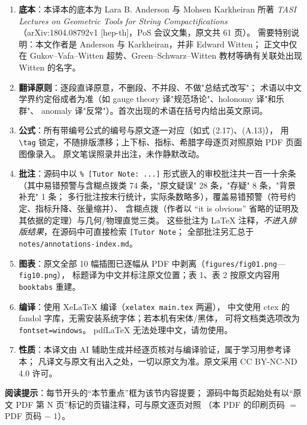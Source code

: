 \documentclass[11pt,a4paper,UTF8,fontset=fandol]{ctexart}
\begin{document}
\begin{enumerate}[label=\arabic*.,leftmargin=2em]
  \item \textbf{底本}：本译本的底本为 Lara B. Anderson 与 Mohsen Karkheiran 所著
        \textit{TASI Lectures on Geometric Tools for String Compactifications}
        （arXiv:1804.08792v1 [hep-th]，PoS 会议文集，原文共 61 页）。
        需要特别说明：本文作者是 Anderson 与 Karkheiran，并非 Edward Witten；
        正文中仅在 Gukov--Vafa--Witten 超势、Green--Schwarz--Witten 教材等确有关联处出现 Witten 的名字。

  \item \textbf{翻译原则}：逐段直译原意，不删段、不并段、不做"总结式改写"；
        术语以中文学界约定俗成者为准（如 gauge theory 译"规范场论"、holonomy 译"和乐群"、
        anomaly 译"反常"）。首次出现的术语在括号内给出英文原词。

  \item \textbf{公式}：所有带编号公式的编号与原文逐一对应（如式 (2.17)、(A.13)），
        用 \verb|\tag| 锁定，不随排版漂移；上下标、指标、希腊字母逐页对照原始 PDF 页面图像录入。
        原文笔误照录并出注，未作静默改动。

  \item \textbf{批注}：源码中以 \verb|% [Tutor Note: ...]| 形式嵌入的审校批注共一百一十余条
        （其中易错预警与含糊点拨类 74 条，"原文疑误" 28 条，"存疑" 8 条，"背景补充" 1 条；
        多行批注按末行统计，实际条数略多），覆盖易错预警（符号约定、指标升降、张量缩并）、
        含糊点拨（作者以 ``it is obvious'' 省略的证明及其依据的定理）与几何/物理直觉三类。
        这些批注为 LaTeX 注释，\emph{不进入排版结果}，在源码中可直接检索 \verb|[Tutor Note|；
        全部批注另汇总于 \verb|notes/annotations-index.md|。

  \item \textbf{图表}：原文全部 10 幅插图已逐幅从 PDF 中剥离（\verb|figures/fig01.png|---\verb|fig10.png|），
        标题译为中文并标注原文位置；表 1、表 2 按原文内容用 \verb|booktabs| 重建。

  \item \textbf{编译}：使用 XeLaTeX 编译（\verb|xelatex main.tex| 两遍），
        中文使用 ctex 的 fandol 字库，无需安装系统字体；若本机有宋体/黑体，
        可将文档类选项改为 \verb|fontset=windows|。
        pdfLaTeX 无法处理中文，请勿使用。

  \item \textbf{性质}：本译文由 AI 辅助生成并经逐页核对与编译验证，属于学习用参考译本；
        凡译文与原文有出入之处，一切以原文为准。原文采用 CC BY-NC-ND 4.0 许可。
\end{enumerate}

\vspace{1.2em}
\noindent\textbf{阅读提示}：每节开头的“本节重点”框为该节内容提要；
源码中每页起始处有以“原文 PDF 第 N 页”标记的页锚注释，可与原文逐页对照
（本 PDF 的印刷页码 $=$ PDF 页码 $-$ 1）。

\clearpage
\tableofcontents
\clearpage









\end{document}
